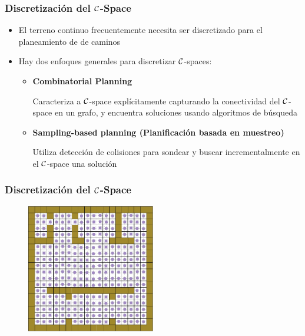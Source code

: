 \begin{frame}
    \frametitle{Discretización del $\mathcal{C}$-Space}
    
    \begin{itemize}
        \item El terreno continuo frecuentemente necesita ser discretizado para el planeamiento de de caminos
        \item Hay dos enfoques generales para discretizar $\mathcal{C}$-spaces:
        \begin{itemize}
            \item \textbf{Combinatorial Planning}
            
            Caracteriza a $\mathcal{C}$-space explícitamente capturando la conectividad del $\mathcal{C}$-space en un grafo, y encuentra soluciones usando algoritmos de búsqueda
            
            \item \textbf{Sampling-based planning (Planificación basada en muestreo)}
            
            Utiliza detección de colisiones para sondear y buscar incrementalmente en el $\mathcal{C}$-space una solución
        \end{itemize}

    \end{itemize}
    
    
    
\end{frame}

\begin{frame}
    \frametitle{Discretización del $\mathcal{C}$-Space}
    
	\begin{figure}[!h]
		\includegraphics[width=0.5\textwidth]{images/discretized_configuration_space.pdf}
	\end{figure}
    
\end{frame}



